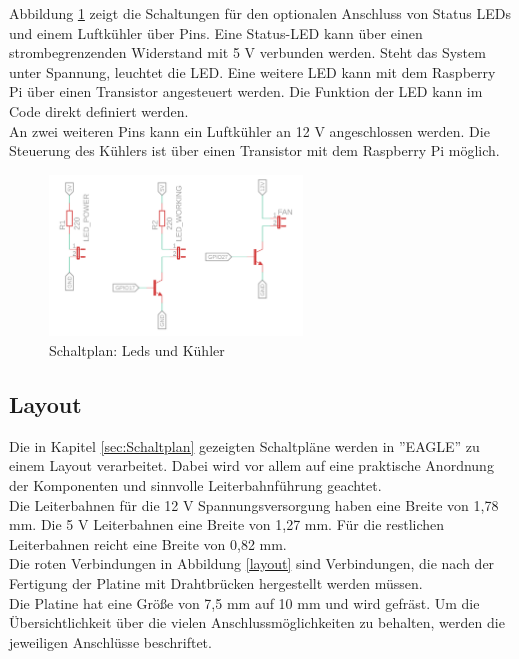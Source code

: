Abbildung \ref{leds} zeigt die Schaltungen für den optionalen Anschluss von Status \acp{LED} und einem Luftkühler über Pins. Eine Status-\ac{LED} kann über einen strombegrenzenden Widerstand mit 5 V verbunden werden. Steht das System unter Spannung, leuchtet die \ac{LED}. Eine weitere \ac{LED} kann mit dem Raspberry Pi über einen Transistor angesteuert werden. Die Funktion der \ac{LED} kann im Code direkt definiert werden.\\
An zwei weiteren Pins kann ein Luftkühler an 12 V angeschlossen werden. Die Steuerung des Kühlers ist über einen Transistor mit dem Raspberry Pi möglich.
  
\begin{figure}[H]
	\centering
	\includegraphics[width=0.6\textwidth]{images/Hardware/Schaltplan/Leds}
	\caption{Schaltplan: Leds und Kühler}
	\label{leds}
\end{figure}

\newpage
\subsection{Layout}
Die in Kapitel \ref{sec:Schaltplan} gezeigten Schaltpläne werden in ''EAGLE'' zu einem Layout verarbeitet. Dabei wird vor allem auf eine praktische Anordnung der Komponenten und sinnvolle Leiterbahnführung geachtet.\\
Die Leiterbahnen für die 12 V Spannungsversorgung haben eine Breite von 1,78 mm. Die 5 V Leiterbahnen eine Breite von 1,27 mm. Für die restlichen Leiterbahnen reicht eine Breite von 0,82 mm. \\
Die roten Verbindungen in Abbildung \ref{layout} sind Verbindungen, die nach der Fertigung der Platine mit Drahtbrücken hergestellt werden müssen. \\
Die Platine hat eine Größe von 7,5 mm auf 10 mm und wird gefräst. Um die Übersichtlichkeit über die vielen Anschlussmöglichkeiten zu behalten, werden die jeweiligen Anschlüsse beschriftet. 


